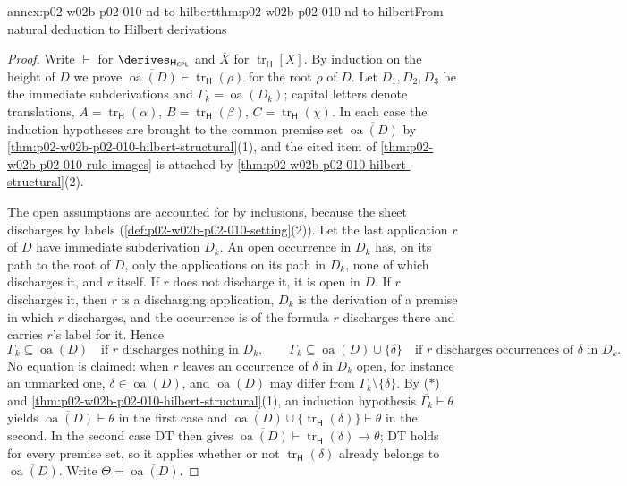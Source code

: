 \begin{annexitem}{annex:p02-w02b-p02-010-nd-to-hilbert}{thm:p02-w02b-p02-010-nd-to-hilbert}{From natural deduction to Hilbert derivations}
\begin{proof}
Write \(\vdash\) for \(\derives_{\mathsf H_{\mathsf{CPL}}}\) and
\(\overline X\) for \(\operatorname{tr}_{\mathsf H}[X]\).  By induction on
the height of \(D\) we prove
\(\overline{\operatorname{oa}(D)}\vdash\operatorname{tr}_{\mathsf H}(\rho)\)
for the root \(\rho\) of \(D\).  Let \(D_1,D_2,D_3\) be the immediate
subderivations and \(\Gamma_k=\operatorname{oa}(D_k)\); capital letters
denote translations, \(A=\operatorname{tr}_{\mathsf H}(\alpha)\),
\(B=\operatorname{tr}_{\mathsf H}(\beta)\),
\(C=\operatorname{tr}_{\mathsf H}(\chi)\).  In each case the induction
hypotheses are brought to the common premise set
\(\overline{\operatorname{oa}(D)}\) by
\cref{thm:p02-w02b-p02-010-hilbert-structural}(1), and the cited item of
\cref{thm:p02-w02b-p02-010-rule-images} is attached by
\cref{thm:p02-w02b-p02-010-hilbert-structural}(2).

The open assumptions are accounted for by inclusions, because the sheet
discharges by labels (\cref{def:p02-w02b-p02-010-setting}(2)).  Let the last
application \(r\) of \(D\) have immediate subderivation \(D_k\).  An open
occurrence in \(D_k\) has, on its path to the root of \(D\), only the
applications on its path in \(D_k\), none of which discharges it, and \(r\)
itself.  If \(r\) does not discharge it, it is open in \(D\).  If \(r\)
discharges it, then \(r\) is a discharging application, \(D_k\) is the
derivation of a premise in which \(r\) discharges, and the occurrence is of
the formula \(r\) discharges there and carries \(r\)'s label for it.  Hence
\[
  \Gamma_k\subseteq\operatorname{oa}(D)
  \quad\text{if \(r\) discharges nothing in \(D_k\)},
  \qquad
  \Gamma_k\subseteq\operatorname{oa}(D)\cup\{\delta\}
  \quad\text{if \(r\) discharges occurrences of \(\delta\) in \(D_k\)}.
  \tag{\(\ast\)}
\]
No equation is claimed: when \(r\) leaves an occurrence of \(\delta\) in
\(D_k\) open, for instance an unmarked one, \(\delta\in\operatorname{oa}(D)\),
and \(\operatorname{oa}(D)\) may differ from \(\Gamma_k\setminus\{\delta\}\).
By (\(\ast\)) and \cref{thm:p02-w02b-p02-010-hilbert-structural}(1), an
induction hypothesis \(\overline{\Gamma_k}\vdash\theta\) yields
\(\overline{\operatorname{oa}(D)}\vdash\theta\) in the first case and
\(\overline{\operatorname{oa}(D)}\cup\{\operatorname{tr}_{\mathsf H}(\delta)\}\vdash\theta\)
in the second.  In the second case DT then gives
\(\overline{\operatorname{oa}(D)}\vdash\operatorname{tr}_{\mathsf H}(\delta)\to\theta\);
DT holds for every premise set, so it applies whether or not
\(\operatorname{tr}_{\mathsf H}(\delta)\) already belongs to
\(\overline{\operatorname{oa}(D)}\).  Write \(\Theta=\overline{\operatorname{oa}(D)}\).


\end{proof}
\end{annexitem}
